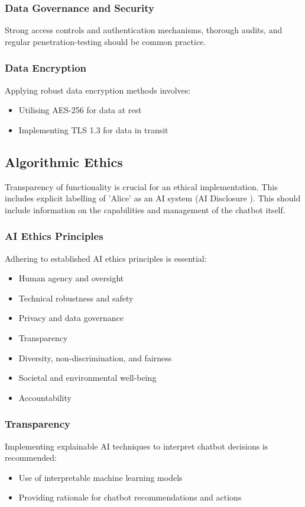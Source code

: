 \documentclass[14pt,a4paper]{article}
\begin{document}
\begin{multicols}{2}
\subsubsection{Data Governance and Security}
Strong access controls and authentication mechanisms, thorough audits, and regular penetration-testing should be common practice.
\textit{\parencite{NCSC2024}}

\subsubsection*{Data Encryption}
Applying robust data encryption methods \textit{\parencite[pp. 100-150]{Stallings2023}} involves:
\begin{itemize}
    \item Utilising AES-256 for data at rest
    \item Implementing TLS 1.3 for data in transit
\end{itemize}


\subsection{Algorithmic Ethics}
Transparency of functionality is crucial for an ethical implementation. This includes explicit labelling of 'Alice' as an AI system (AI Disclosure \textit{\parencite{IEEE2023}}). This should include information on the capabilities and management of the chatbot itself.

\subsubsection{AI Ethics Principles}
Adhering to established AI ethics principles \textit{\parencite{EC2024}} is essential:
\begin{itemize}
    \item Human agency and oversight
    \item Technical robustness and safety
    \item Privacy and data governance
    \item Transparency
    \item Diversity, non-discrimination, and fairness
    \item Societal and environmental well-being
    \item Accountability
\end{itemize}

\subsubsection{Transparency}
Implementing explainable AI techniques to interpret chatbot decisions \textit{\parencite[pp. 82-115]{Arrieta2022}} is recommended:
\begin{itemize}
    \item Use of interpretable machine learning models
    \item Providing rationale for chatbot recommendations and actions
\end{itemize}


\end{multicols}
\end{document}
